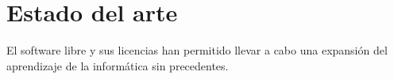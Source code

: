 \chapter{Estado del arte}

El software libre y sus licencias \cite{gplv3} han permitido llevar a cabo una expansión del
aprendizaje de la informática sin precedentes.
